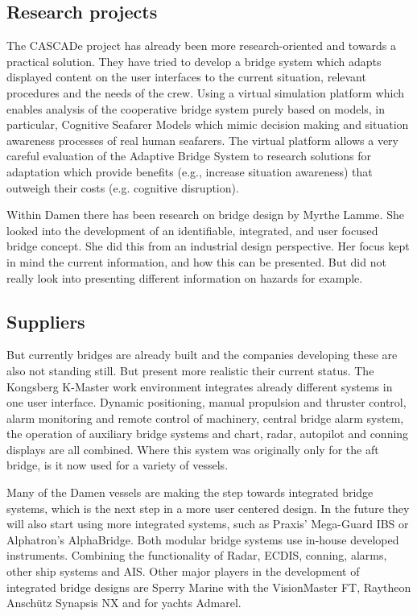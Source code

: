 \subsection{Research projects}
The CASCADe project has already been more research-oriented and towards a practical solution. They have tried to develop a bridge system which adapts displayed content on the user interfaces to the current situation, relevant procedures and the needs of the crew. Using a virtual simulation platform which enables analysis of the cooperative bridge system purely based on models, in particular, Cognitive Seafarer Models which mimic decision making and situation awareness processes of real human seafarers. The virtual platform allows a very careful evaluation of the Adaptive Bridge System to research solutions for adaptation which provide benefits (e.g., increase situation awareness) that outweigh their costs (e.g. cognitive disruption).\cite{CASCADe2015}

Within Damen there has been research on bridge design by Myrthe Lamme. She looked into the development of an identifiable, integrated, and user focused bridge concept. She did this from an industrial design perspective. Her focus kept in mind the current information, and how this can be presented. But did not really look into presenting different information on hazards for example.


\subsection{Suppliers}
But currently bridges are already built and the companies developing these are also not standing still. But present more realistic their current status. The Kongsberg K-Master work environment integrates already different systems in one user interface. Dynamic positioning, manual propulsion and thruster control, alarm monitoring and remote control of machinery, central bridge alarm system, the operation of auxiliary bridge systems and chart, radar, autopilot and conning displays are all combined. Where this system was originally only for the aft bridge, is it now used for a variety of vessels. \cite{Kongsberg2017}

Many of the Damen vessels are making the step towards integrated bridge systems, which is the next step in a more user centered design. In the future they will also start using more integrated systems, such as Praxis' Mega-Guard IBS or Alphatron's AlphaBridge. Both modular bridge systems use in-house developed instruments. Combining the functionality of Radar, ECDIS, conning, alarms, other ship systems and AIS. 
Other major players in the development of integrated bridge designs are Sperry Marine with the VisionMaster FT, Raytheon Anschütz Synapsis NX and for yachts Admarel.


